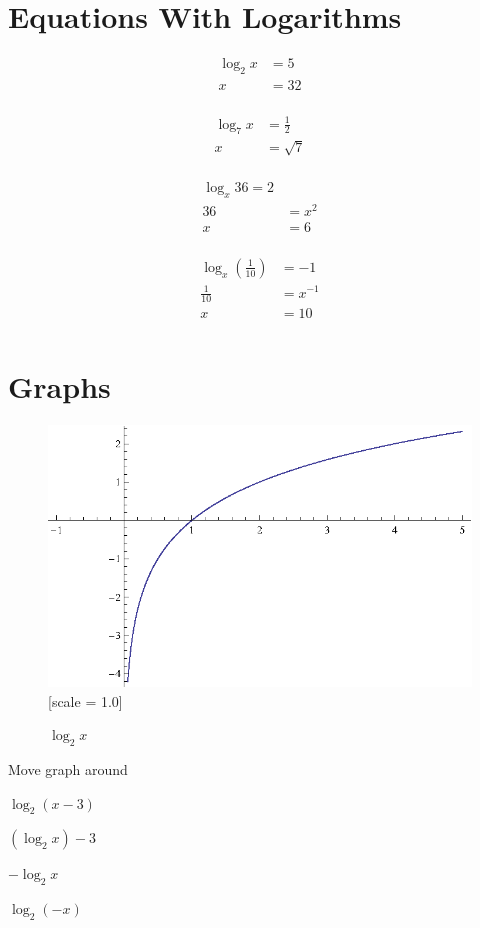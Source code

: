 \documentclass{exam}
\begin{document}
  \section{Equations With Logarithms}
  \begin{align*}
    \log_2 x &= 5 \\
    x        &= 32 \\
  \end{align*}
  
  \begin{align*}
    \log_7 x &= \frac{1}{2} \\
    x        &= \sqrt{7} \\
  \end{align*}

  \begin{align*}
    \log_x 36 = 2 \\
    36               &= x^2 \\
    x                &= 6 \\
  \end{align*}

  \begin{align*}
    \log_x \left( \frac{1}{10} \right) &= -1 \\
    \frac{1}{10}                       &= x^{-1} \\
    x                                  &= 10 \\
  \end{align*}

  \section{Graphs}

  \begin{figure}[H]
    \centering
    \includegraphics{figure1.eps}[scale = 1.0]
    \caption{$\log_2 x$}
  \end{figure}

  Move graph around
  \begin{itemize*}
    \item $\log_2 (x - 3)$
    \item $(\log_2 x) - 3$
    \item $- \log_2 x$
    \item $\log_2 (-x)$
  \end{itemize*}
  
\end{document}
